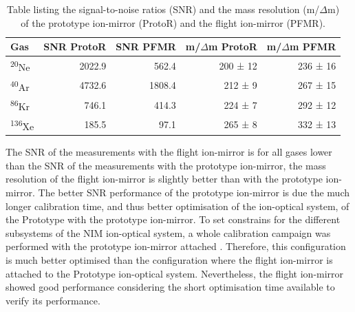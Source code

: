 	\begin{table}
		\begin{center}
		\begin{tabular}{|l|r|r|r|r|}
			\hline
			Gas						&SNR ProtoR	&SNR PFMR	&m/$\Delta$m ProtoR	&m/$\Delta$m PFMR\\
			\hline
			\textsuperscript{20}Ne	&2022.9		&562.4		&200 ± 12		&236 ± 16\\
			\textsuperscript{40}Ar	&4732.6		&1808.4		&212 ±  9		&267 ± 15\\
			\textsuperscript{86}Kr	&746.1		&414.3		&224 ±  7		&292 ± 12\\
			\textsuperscript{136}Xe	&185.5		&97.1		&265 ±  8		&332 ± 13\\
			\hline
		\end{tabular}
		\end{center}
		\caption{Table listing the signal-to-noise ratios (SNR) and the mass resolution (m/$\Delta$m) of the prototype ion-mirror (ProtoR) and the flight ion-mirror (PFMR).}
		\label{tab:refPerftab}
	\end{table}
	The SNR of the measurements with the flight ion-mirror is for all gases lower than the SNR of the measurements with the prototype ion-mirror, the mass resolution of the flight ion-mirror is slightly better than with the prototype ion-mirror. The better SNR performance of the prototype ion-mirror is due the much longer calibration time, and thus better optimisation of the ion-optical system, of the Prototype with the prototype ion-mirror. To set constrains for the different subsystems of the NIM ion-optical system, a whole calibration campaign was performed with the prototype ion-mirror attached \cite{Diss_Meyer}. Therefore, this configuration is much better optimised than the configuration where the flight ion-mirror is attached to the Prototype ion-optical system. Nevertheless, the flight ion-mirror showed good performance considering the short optimisation time available to verify its performance.
	
	
